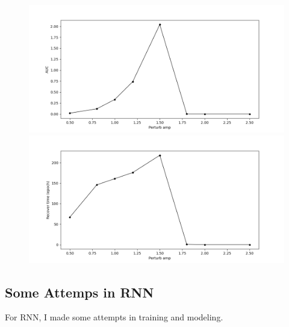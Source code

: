 \documentclass[12pt, a4paper]{article}
\begin{document}
\begin{figure}[H]
    \centering
    \includegraphics[width=\textwidth]{baseline_abb05/fig/0221_abb05_perturbamp_auc.png} \\
    \includegraphics[width=\textwidth]{baseline_abb05/fig/0221_abb05_perturbamp_rectime.png} \\
\end{figure}
\newpage

\subsection*{Some Attemps in RNN}

For RNN, I made some attempts in training and modeling. 
\end{document}

